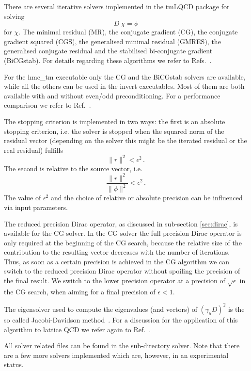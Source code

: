 There are several iterative solvers implemented in the tmLQCD
package for solving 
\[
D\ \chi = \phi
\]
for $\chi$. The minimal residual (MR), the conjugate gradient (CG), the
conjugate gradient squared (CGS), the generalised minimal residual
(GMRES), the generalised conjugate residual and the stabilised
bi-conjugate gradient (BiCGstab). For details regarding these
algorithms we refer to Refs.~\cite{saad:2003a,meister:1999}.

For the {\ttfamily hmc\_tm} executable only the CG and the BiCGstab
solvers are available, while all the others can be used in the
{\ttfamily invert} executables. Most of them are both available with
and without even/odd preconditioning. For a performance comparison we
refer to Ref.~\cite{Chiarappa:2004ry,Chiarappa:2006hz}.

The stopping criterion is implemented in two ways: the first is an
absolute stopping criterion, i.e. the solver is stopped when the
squared norm of the residual vector (depending on the solver this
might be the iterated residual or the real residual) fulfills
\[
\|r\|^2 < \epsilon^2\, .
\]
The second is relative to the source vector, i.e.
\[
\frac{\|r\|^2}{\|\phi\|^2} < \epsilon^2\, .
\]
The value of $\epsilon^2$ and the choice of relative or absolute precision can be
influenced via input parameters.

The reduced precision Dirac operator, as discussed in sub-section
\ref{sec:dirac}, is available for the CG solver. In the CG solver the 
full precision Dirac operator is only required at the beginning of the
CG search, because the relative size of the contribution to the
resulting vector decreases with the number of iterations. Thus, as soon
as a certain precision is achieved in the CG algorithm we can switch to
the reduced precision Dirac operator without spoiling the precision of
the final result. We switch to the lower precision operator 
at a precision of $\sqrt{\epsilon}$ in the CG search, when aiming for a
final precision of $\epsilon < 1$.

The eigensolver used to compute the eigenvalues (and vectors) of
$(\gamma_5 D)^2$ is the so called Jacobi-Davidson 
method~\cite{Sleijpen:1996aa,Geus:2002}. For a discussion for the
application of this algorithm to lattice QCD we refer again to
Ref.~\cite{Chiarappa:2004ry,Chiarappa:2006hz}. 

All solver related files can be found in the sub-directory {\ttfamily
  solver}. Note that there are a few more solvers implemented which
are, however, in an experimental status.

